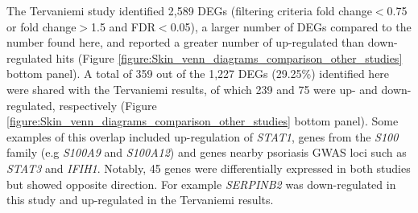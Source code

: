 The Tervaniemi study identified 2,589 DEGs (filtering criteria fold change$<$0.75 or fold change$>$1.5 and FDR$<$0.05), a larger number of DEGs compared to the number found here, and reported a greater number of up-regulated than down-regulated hits (Figure \ref{figure:Skin_venn_diagrams_comparison_other_studies} bottom panel). A total of 359 out of the 1,227 DEGs (29.25\%) identified here were shared with the Tervaniemi results, of which 239 and 75 were up- and down-regulated, respectively (Figure \ref{figure:Skin_venn_diagrams_comparison_other_studies} bottom panel). Some examples of this overlap included up-regulation of \textit{STAT1}, genes from the \textit{S100} family (e.g \textit{S100A9} and \textit{S100A12}) and genes nearby psoriasis GWAS loci such as \textit{STAT3} and \textit{IFIH1}. Notably, 45 genes were differentially expressed in both studies but showed opposite direction. For example \textit{SERPINB2} was down-regulated in this study and up-regulated in the Tervaniemi results. 





